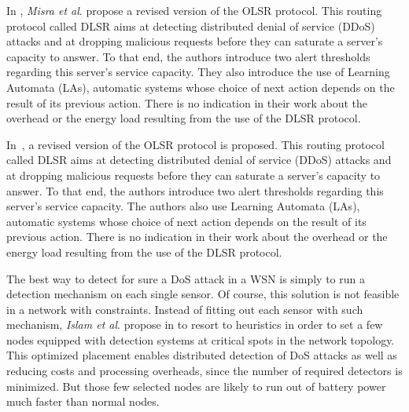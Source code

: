 
In
\cite{MKASF10},
\textit{Misra et al}. propose a revised version of the OLSR protocol.
This routing protocol called DLSR aims at detecting distributed denial of service (DDoS) attacks and at dropping malicious requests before they can saturate a server's capacity to answer.
To that end, the authors introduce two alert thresholds regarding this server's service capacity.
They also introduce the use of Learning Automata (LAs), automatic systems whose choice of next action depends on the result of its previous action.
There is no indication in their work about the overhead or the energy load resulting from the use of the DLSR protocol.

In~\cite{MKASF10}, a revised version of the OLSR protocol is proposed.
This routing protocol called DLSR aims at detecting distributed denial of service (DDoS) attacks and at dropping malicious requests before they can saturate a server's capacity to answer.
To that end, the authors introduce two alert thresholds regarding this server's service capacity.
The authors also use Learning Automata (LAs), automatic systems whose choice of next action depends on the result of its previous action.
There is no indication in their work about the overhead or the energy load resulting from the use of the DLSR protocol.



The best way to detect for sure a DoS attack in a WSN is simply to run a detection mechanism on each single sensor.
Of course, this solution is not feasible in a network with constraints.
Instead of fitting out each sensor with such mechanism, \textit{Islam et al}. propose in
\cite{INK09}
to resort to heuristics in order to set a few nodes equipped with detection systems at critical spots in the network topology.
This optimized placement enables distributed detection of DoS attacks as well as reducing costs and processing overheads, since the number of required detectors is minimized.
But those few selected nodes are likely to run out of battery power much faster than normal nodes.

